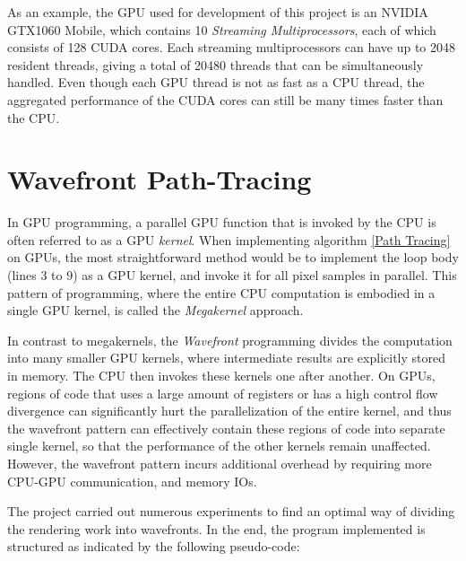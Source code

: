 As an example, the GPU used for development of this project is an NVIDIA GTX1060 Mobile, which contains 10 \textit{Streaming Multiprocessors}, each of which consists of 128 CUDA cores. Each streaming multiprocessors can have up to 2048 resident threads, giving a total of 20480 threads that can be simultaneously handled. Even though each GPU thread is not as fast as a CPU thread, the aggregated performance of the CUDA cores can still be many times faster than the CPU.




\section{Wavefront Path-Tracing}
In GPU programming, a parallel GPU function that is invoked by the CPU is often referred to as a GPU \textit{kernel}. When implementing algorithm \ref{Path Tracing} on GPUs, the most straightforward method would be to implement the loop body (lines 3 to 9) as a GPU kernel, and invoke it for all pixel samples in parallel. This pattern of programming, where the entire CPU computation is embodied in a single GPU kernel, is called the \textit{Megakernel}\cite{megakernel} approach.

In contrast to megakernels, the \textit{Wavefront} programming divides the computation into many smaller GPU kernels, where intermediate results are explicitly stored in memory. The CPU then invokes these kernels one after another. On GPUs, regions of code that uses a large amount of registers or has a high control flow divergence can significantly hurt the parallelization of the entire kernel, and thus the wavefront pattern can effectively contain these regions of code into separate single kernel, so that the performance of the other kernels remain unaffected. However, the wavefront pattern incurs additional overhead by requiring more CPU-GPU communication, and memory IOs.

The project carried out numerous experiments to find an optimal way of dividing the rendering work into wavefronts. In the end, the program implemented is structured as indicated by the following pseudo-code:


